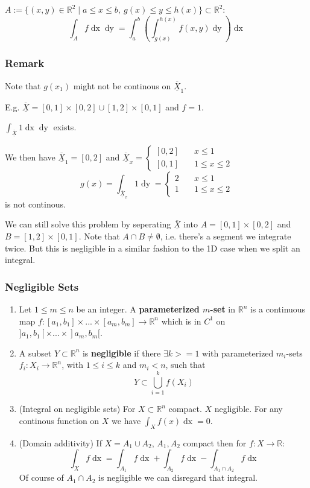 \documentclass[a4paper,fontsize = 8pt]{scrartcl}
\def\R{\mathbb{R}}
\def\X{\underline{\overline{X}}}
\begin{document}
$A := \{(x,y)\in \R^2 \mid a \leq x \leq b, \ g(x) \leq y \leq h(x)\} \subset \R^2$:
\[\int_A f \mathop{dx}\mathop{dy} = \int_{a}^{b} \left(\int_{g(x)}^{h(x)}f(x,y) \mathop{dy}\right)\mathop{dx}\]

\subsubsection*{Remark}
Note that $g(x_1)$ might not be continous on $\X_1$. 

E.g. $\X = [0, 1] \times [0, 2] \cup [1, 2] \times [0, 1]$ and $f = 1$.

\(\int_{\X}1\mathop{dx}\mathop{dy}\) exists. 

We then have $\X_1 = [0,2]$ and $ \X_{x} = 
\begin{cases}
   [0,2] \quad& x \leq 1\\
   [0,1] \quad& 1 \leq x \leq 2
\end{cases}
$
\[
     g(x)= \int_{\X_x}1 \mathop{dy} = 
    \begin{cases}
        2 \quad& x \leq 1\\
        1 \quad& 1 \leq x \leq 2
    \end{cases}
\]
is not continous.

We can still solve this problem by seperating $\X$ into $A = [0, 1] \times [0,2]$ and $B = [1,2] \times [0,1]$. Note that $A \cap B \neq \emptyset$, i.e. there's a segment we integrate twice. But this is negligible in a similar fashion to the 1D case when we split an integral.

\subsubsection{Negligible Sets}
\begin{enumerate}
    \item Let $1 \leq m \leq n$ be an integer. A \textbf{parameterized $m$-set} in $\R^n$ is a continuous map $f: [a_1,b_1] \times ... \times [a_m,b_m] \to \R^n$ which is in $C^1$ on $]a_1,b_1[ \times ... \times ]a_m, b_m[.$
    \item A subset $Y \subset \R^n$ is \textbf{negligible} if there $\exists k >= 1$ with parameterized $m_i$-sets $f_i: X_i \to \R^n$, with $1 \leq i \leq k$ and $m_i < n$, such that \[Y \subset \bigcup_{i = 1}^{k}f(X_i)\] 
    \item (Integral on negligible sets) For $X \subset \R^n$ compact. $X$ negligible. For any continous function on $X$ we have $\int_{X}f(x)\mathop{dx} = 0$.
    \item (Domain additivity) If $X = A_1 \cup A_2$, $A_1, A_2$ compact then for $f: X \to \R$: 
    \[\int_X f\mathop{dx} = \int_{A_1}f\mathop{dx} + \int_{A_2}f\mathop{dx} -\int_{A_1 \cap A_2}f\mathop{dx}\]
    Of course of $A_1 \cap A_2$ is negligible we can disregard that integral.
\end{enumerate}
\end{document}
